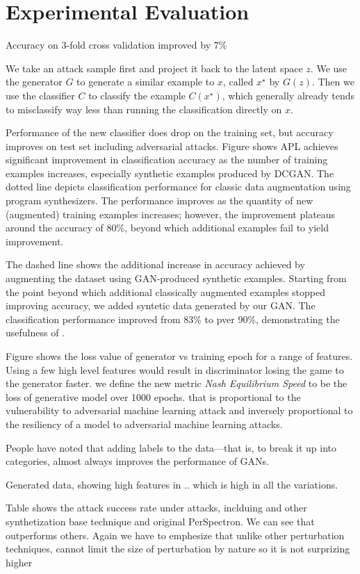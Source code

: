 \section{Experimental Evaluation}\label{results}




Accuracy on 3-fold cross validation improved by 7\%


We take an attack sample first and project it back to the latent space $z$.
We use the generator $G$ to generate a similar example to $x$, called ${x^{\star}}$ by $G(z)$. Then we use the classifier $C$ to classify the example $C(x^{\star})$, which generally already tends to misclassify way less than running the classification directly on $x$. 

Performance of the new classifier does drop on the training set, but accuracy improves on test set including adversarial attacks. Figure shows APL achieves significant improvement in classification accuracy as the number of training examples increases, especially synthetic examples produced by DCGAN. The dotted line depicts classification performance for classic data augmentation using program synthesizers. The performance improves as the quantity of new (augmented) training examples increases; however, the improvement plateaus around the accuracy of 80\%, beyond which additional examples fail to yield improvement. 

The dashed line shows the additional increase in accuracy achieved by augmenting the dataset using GAN-produced synthetic examples. Starting from the point beyond which additional classically augmented examples stopped improving accuracy, we added syntetic data generated by our GAN. The classification performance improved from 83\% to pver 90\%, demonstrating the usefulness of \scheme. 

Figure shows the loss value of generator vs training epoch for a range of features. Using a few high level features would result in discriminator losing the game to the generator faster. we define the new metric {\em Nash Equilibrium Speed} to be the loss of generative model over 1000 epochs. that is proportional to the vulnerability to adversarial machine learning attack and  inversely proportional  to the resiliency of a model to adversarial machine learning attacks. 

People have noted that adding labels to the data—that is, to break it up into categories, almost always improves the performance of GANs.

Generated data, showing high features in .. which is high in all the variations. 


Table shows the attack success rate under attacks, inclduing {\scheme} and other synthetization base technique and original PerSpectron. We can see that {\scheme} outperforms others. 
Again we have to emphesize that unlike other perturbation techniques, {\scheme} cannot limit the size of perturbation by nature so it is not surprizing higher 